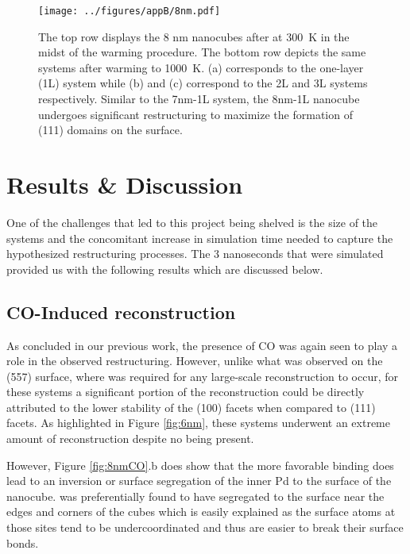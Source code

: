 {\begin{landscape}
\begin{figure}[p!]
\centering
  \texttt{[image: ../figures/appB/8nm.pdf]}
  \caption{The top row displays the 8 nm nanocubes after at 300~K in the midst of the warming procedure. 
The bottom row depicts the same systems after warming to
1000~K.  (a) corresponds to the one-layer (1L) system while (b) and (c)
correspond to the 2L and 3L systems respectively. Similar to the 7nm-1L system,
the 8nm-1L nanocube undergoes significant restructuring to maximize the
formation of (111) domains on the surface.}
  \label{fig:8nm}
\end{figure}
\end{landscape}



\section{Results \& Discussion}
One of the challenges that led to this project being shelved is the size of the
systems and the concomitant increase in simulation time needed to capture the
hypothesized restructuring processes. The 3 nanoseconds that were simulated
provided us with the following results which are discussed below.


\subsection{CO-Induced reconstruction}
As concluded in our previous work\citep{Michalka:2013aa}, the presence of CO was again
seen to play a role in the observed restructuring. However, unlike what was
observed on the  (557) surface, where  was
required for any large-scale reconstruction to occur, for these systems a
significant portion of the reconstruction could be directly attributed to the lower
stability of the (100) facets when compared to (111) facets. As highlighted in
Figure \ref{fig:6nm}, these systems underwent an extreme amount of
reconstruction despite no  being present. 

However, Figure \ref{fig:8nmCO}.b does show that the more favorable
 binding does lead to an inversion or surface segregation of
the inner Pd to the surface of the nanocube.  was preferentially found
to have segregated to the surface near the edges and corners of the cubes which
is easily explained as the surface atoms at those sites tend to be
undercoordinated and thus are easier to break their surface bonds.

}
